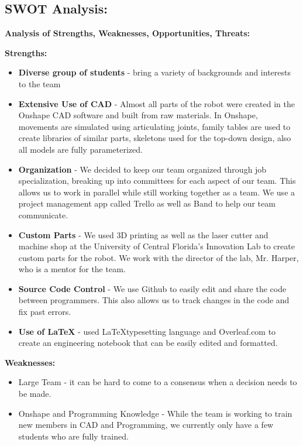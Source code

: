 \subsection*{\textbf{\Huge SWOT Analysis:}}
\vspace{.2cm}
\setlength{\parindent}{.25in} 

\textbf{Analysis of Strengths, Weaknesses, Opportunities, Threats:}
\vspace{.2cm}

\textbf{Strengths:} 
\begin{itemize}
\item \textbf{Diverse group of students} - bring a variety of backgrounds and interests to the team
\item \textbf{Extensive Use of CAD} - Almost all parts of the robot were created in the Onshape CAD software and built from raw materials. In Onshape, movements are simulated using articulating joints, family tables are used to create libraries of similar parts, skeletons used for the top-down design, also all models are fully parameterized.
\item \textbf{Organization} - We decided to keep our team organized through job specialization, breaking up into committees for each aspect of our team. This allows us to work in parallel while still working together as a team. We use a project management app called Trello as well as Band to help our team communicate.  
\item \textbf{Custom Parts} - We used 3D printing as well as the laser cutter and machine shop at the University of Central Florida's Innovation Lab to create custom parts for the robot. We work with the director of the lab, Mr. Harper, who is a mentor for the team. 
\item \textbf{Source Code Control} - We use Github to easily edit and share the code between programmers. This also allows us to track changes in the code and fix past errors.
\item \textbf{Use of \LaTeX} - used \LaTeX typesetting language and Overleaf.com to create an engineering notebook that can be easily edited and formatted.
\end{itemize}

\textbf{Weaknesses:} 
\begin{itemize}
\item Large Team - it can be hard to come to a consensus when a decision needs to be made.
\item Onshape and Programming Knowledge - While the team is working to train new members in CAD and Programming, we currently only have a few students who are fully trained.
\end{itemize}

